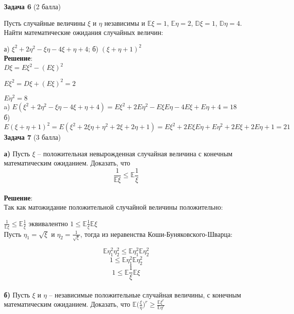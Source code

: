 \documentclass{article}
\begin{document}
\textbf{Задача 6} (2 балла)

Пусть случайные величины $\xi$  и $\eta$ независимы и $\mathbb{E}\xi = 1$, $\mathbb{E}\eta = 2$, $\mathbb{D}\xi = 1$,  $\mathbb{D}\eta = 4$. Найти математические ожидания случайных величин:

а) $\xi^2 + 2\eta^2 - \xi\eta - 4\xi + \eta + 4$; б) $(\xi + \eta + 1)^2$\\


\textbf{Решение}:\\

$D\xi = E\xi^2 - (E\xi)^2$

$E\xi^2 = D\xi + (E\xi)^2 = 2$

$E\eta^2 = 8$\\

a) $E(\xi^2 + 2\eta^2 - \xi\eta - 4\xi + \eta + 4) = E\xi^2 + 2E\eta^2 - E\xi E\eta - 4E\xi + E\eta + 4 = 18$\\

б) $E(\xi + \eta + 1)^2 = E(\xi^2 + 2\xi\eta + \eta^2 + 2\xi + 2\eta +1) = E\xi^2 + 2E\xi E\eta + E\eta^2 + 2E\xi + 2E\eta +1 = 21$\\

\textbf{Задача 7} (3 балла)

\textbf{а)} Пусть $\xi$ -- положительная невырожденная случайная величина с конечным математическим ожиданием. Доказать, что $$\frac{1}{\mathbb{E}\xi} \leq \mathbb{E}\frac{1}{\xi}$$\\

\textbf{Решение}:\\

Так как матожидание положительной случайной величины положительно: 

$\frac{1}{\mathbb{E}\xi} \leq \mathbb{E}\frac{1}{\xi}$ эквивалентно $1\leq \mathbb{E}\frac{1}{\xi}\mathbb{E}\xi$\\

Пусть $\eta_1 = \sqrt{\xi}$ и $\eta_2 = \frac{1}{\sqrt{\xi}}$, тогда из неравенства Коши-Буняковского-Шварца:

$$\mathbb{E}\eta_1^2\eta_2^2 \leq \mathbb{E}\eta_1^2\mathbb{E}\eta_2^2$$
$$1 \leq \mathbb{E}\eta_1^2\mathbb{E}\eta_2^2$$
$$1\leq \mathbb{E}\frac{1}{\xi}\mathbb{E}\xi$$\\

\textbf{б)} Пусть $\xi$ и $\eta$ -- независимые положительные случайная величины, с конечным математическим ожиданием. Доказать, что
$\mathbb{E}\Big(\frac{\xi}{\eta}\Big)^r \geq \frac{\mathbb{E}\xi^r}{\mathbb{E}\eta^r}$\\
\end{document}
